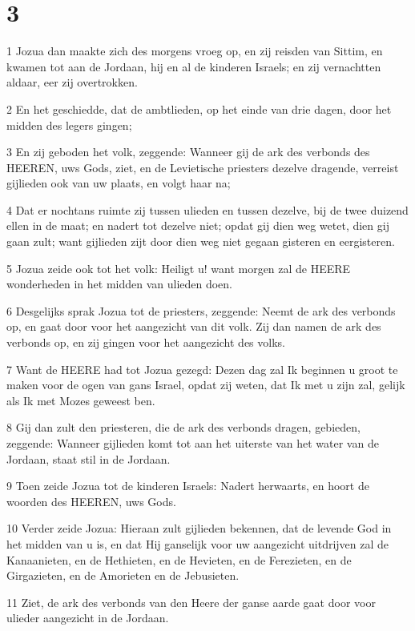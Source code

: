 \chapter{3}

\par 1 Jozua dan maakte zich des morgens vroeg op, en zij reisden van Sittim, en kwamen tot aan de Jordaan, hij en al de kinderen Israels; en zij vernachtten aldaar, eer zij overtrokken.
\par 2 En het geschiedde, dat de ambtlieden, op het einde van drie dagen, door het midden des legers gingen;
\par 3 En zij geboden het volk, zeggende: Wanneer gij de ark des verbonds des HEEREN, uws Gods, ziet, en de Levietische priesters dezelve dragende, verreist gijlieden ook van uw plaats, en volgt haar na;
\par 4 Dat er nochtans ruimte zij tussen ulieden en tussen dezelve, bij de twee duizend ellen in de maat; en nadert tot dezelve niet; opdat gij dien weg wetet, dien gij gaan zult; want gijlieden zijt door dien weg niet gegaan gisteren en eergisteren.
\par 5 Jozua zeide ook tot het volk: Heiligt u! want morgen zal de HEERE wonderheden in het midden van ulieden doen.
\par 6 Desgelijks sprak Jozua tot de priesters, zeggende: Neemt de ark des verbonds op, en gaat door voor het aangezicht van dit volk. Zij dan namen de ark des verbonds op, en zij gingen voor het aangezicht des volks.
\par 7 Want de HEERE had tot Jozua gezegd: Dezen dag zal Ik beginnen u groot te maken voor de ogen van gans Israel, opdat zij weten, dat Ik met u zijn zal, gelijk als Ik met Mozes geweest ben.
\par 8 Gij dan zult den priesteren, die de ark des verbonds dragen, gebieden, zeggende: Wanneer gijlieden komt tot aan het uiterste van het water van de Jordaan, staat stil in de Jordaan.
\par 9 Toen zeide Jozua tot de kinderen Israels: Nadert herwaarts, en hoort de woorden des HEEREN, uws Gods.
\par 10 Verder zeide Jozua: Hieraan zult gijlieden bekennen, dat de levende God in het midden van u is, en dat Hij ganselijk voor uw aangezicht uitdrijven zal de Kanaanieten, en de Hethieten, en de Hevieten, en de Ferezieten, en de Girgazieten, en de Amorieten en de Jebusieten.
\par 11 Ziet, de ark des verbonds van den Heere der ganse aarde gaat door voor ulieder aangezicht in de Jordaan.
